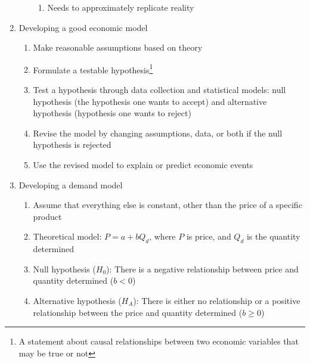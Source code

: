 \documentclass[12pt]{article}
\begin{document}
\begin{enumerate}
\begin{enumerate}
\begin{enumerate}
              \item Needs to approximately replicate reality

            \end{enumerate}

        \end{enumerate}

      \item Developing a good economic model

        \begin{enumerate}

          \item Make reasonable assumptions based on theory

          \item Formulate a testable hypothesis\footnote{A statement about causal relationships between two economic variables that may be true or not}

          \item Test a hypothesis through data collection and statistical models: null hypothesis (the hypothesis one wants to accept) and alternative hypothesis (hypothesis one wants to reject)

          \item Revise the model by changing assumptions, data, or both if the null hypothesis is rejected

          \item Use the revised model to explain or predict economic events

        \end{enumerate}

      \item Developing a demand model

        \begin{enumerate}

          \item Assume that everything else is constant, other than the price of a specific product

          \item Theoretical model: $P=a+bQ_d$, where $P$ is price, and $Q_d$ is the quantity determined

          \item Null hypothesis ($H_0$): There is a negative relationship between price and quantity determined ($b<0$)

          \item Alternative hypothesis ($H_A$): There is either no relationship or a positive relationship between the price and quantity determined ($b\geq0$)


\end{enumerate}
\end{enumerate}
\end{document}
